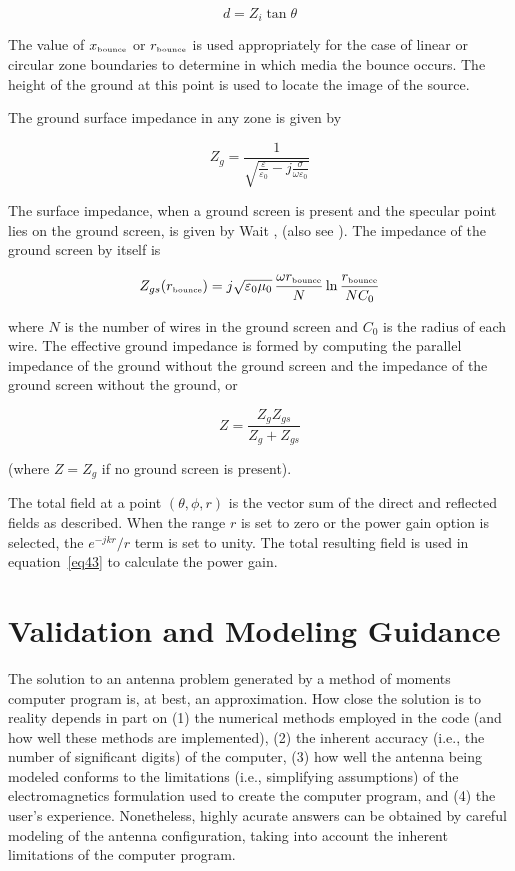 \documentclass[12pt]{article}
\begin{document}
\begin{equation}
d = Z_i \tan\theta
\label{eq54}
\end{equation}

The value of $x_{\mbox{\tiny bounce}}$ or $r_{\mbox{\tiny bounce}}$ is used
appropriately for the case of linear or circular zone boundaries to
determine in which media the bounce occurs. The height of the ground at
this point is used to locate the image of the source.

The ground surface impedance in any zone is given by

\begin{equation}
Z_g = \frac{1}{\sqrt{\frac{\varepsilon}{\varepsilon_0}
                    - j\frac{\sigma}{\omega\varepsilon_0}}}
\label{eq55}
\end{equation}

The surface impedance, when a ground screen is present and the specular
point lies on the ground screen, is given by Wait
\cite{r14}, (also see \cite{r4}). The impedance of
the ground screen by itself is

\[
Z_{gs} (r_{\mbox{\tiny bounce}}) = j\sqrt{\varepsilon_0\mu_0}\,
\frac{\omega r_{\mbox{\tiny bounce}}}{N} \ln \frac{r_{\mbox{\tiny bounce}}}{NC_0}
\]

\noindent
where $N$ is the number of wires in the ground screen and $C_0$ is the
radius of each wire. The effective ground impedance is formed by
computing the parallel impedance of the ground without the ground screen
and the impedance of the ground screen without the ground, or

\begin{equation}
Z = \frac{Z_g Z_{gs}}{Z_g + Z_{gs}}
\label{eq56}
\end{equation}

\noindent (where $Z=Z_g$ if no ground screen is present).

The total field at a point $(\theta,\phi,r)$ is the vector sum of the
direct and reflected fields as described. When the range $r$
is set to zero or the power gain option is selected, the
$e^{-jkr} / r$ term is set to unity. The total resulting field is used
in equation~\eqref{eq43} to calculate the power gain.

\section{Validation and Modeling Guidance}
\label{sec-validation}
The solution to an antenna problem generated by a method of moments
computer program is, at best, an approximation. How close the solution
is to reality depends in part on (1) the numerical methods employed in
the code (and how well these methods are implemented), (2) the inherent
accuracy (i.e., the number of significant digits) of the computer, (3)
how well the antenna being modeled conforms to the limitations (i.e.,
simplifying assumptions) of the electromagnetics formulation used to
create the computer program, and (4) the user's experience. Nonetheless,
highly acurate answers can be obtained by careful modeling of the
antenna configuration, taking into account the inherent limitations of
the computer program.
\end{document}

